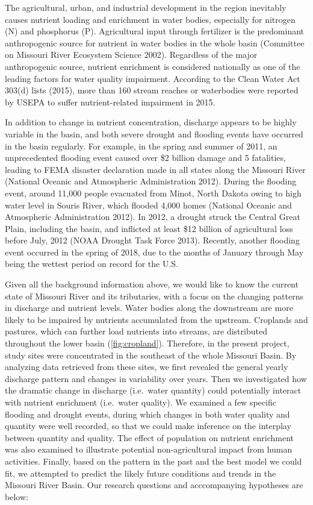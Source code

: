 \documentclass[12pt,]{article}
\begin{document}
The agricultural, urban, and industrial development in the region
inevitably causes nutrient loading and enrichment in water bodies,
especially for nitrogen (N) and phosphorus (P). Agricultural input
through fertilizer is the predominant anthropogenic source for nutrient
in water bodies in the whole basin (Committee on Missouri River
Ecosystem Science 2002). Regardless of the major anthropogenic source,
nutrient enrichment is considered nationally as one of the leading
factors for water quality impairment. According to the Clean Water Act
303(d) lists (2015), more than 160 stream reaches or waterbodies were
reported by USEPA to suffer nutrient-related impairment in 2015.

In addition to change in nutrient concentration, discharge appears to be
highly variable in the basin, and both severe drought and flooding
events have occurred in the basin regularly. For example, in the spring
and summer of 2011, an unprecedented flooding event caused over \$2
billion damage and 5 fatalities, leading to FEMA disaster declaration
made in all states along the Missouri River (National Oceanic and
Atmospheric Administration 2012). During the flooding event, around
11,000 people evacuated from Minot, North Dakota owing to high water
level in Souris River, which flooded 4,000 homes (National Oceanic and
Atmospheric Administration 2012). In 2012, a drought struck the Central
Great Plain, including the basin, and inflicted at least \$12 billion of
agricultural loss before July, 2012 (NOAA Drought Task Force 2013).
Recently, another flooding event occurred in the spring of 2018, due to
the months of January through May being the wettest period on record for
the U.S.

Given all the background information above, we would like to know the
current state of Missouri River and its tributaries, with a focus on the
changing patterns in discharge and nutrient levels. Water bodies along
the downstream are more likely to be impaired by nutrients accumulated
from the upstream. Croplands and pastures, which can further load
nutrients into streams, are distributed throughout the lower basin
(\autoref{fig:cropland}). Therefore, in the present project, study sites
were concentrated in the southeast of the whole Missouri Basin. By
analyzing data retrieved from these sites, we first revealed the general
yearly discharge pattern and changes in variability over years. Then we
investigated how the dramatic change in discharge (i.e.~water quantity)
could potentially interact with nutrient enrichment (i.e.~water
quality). We examined a few specific flooding and drought events, during
which changes in both water quality and quantity were well recorded, so
that we could make inference on the interplay between quantity and
quality. The effect of population on nutrient enrichment was also
examined to illustrate potential non-agricultural impact from human
activities. Finally, based on the pattern in the past and the best model
we could fit, we attempted to predict the likely future conditions and
trends in the Missouri River Basin. Our research questions and
acccompanying hypotheses are below:
\end{document}
